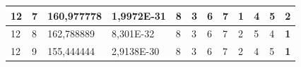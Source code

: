 \documentclass[conference]{IEEEtran}
\begin{document}
\begin{table}[]
\begin{tabular}{|llll|llllllll|}
\multicolumn{1}{|l|}{12}                                                    & \multicolumn{1}{l|}{7}                                                        & \multicolumn{1}{l|}{160,977778}                                                   & 1,9972E-31                     & \multicolumn{1}{l|}{8}                                                  & \multicolumn{1}{l|}{3}                                                  & \multicolumn{1}{l|}{6}                                                  & \multicolumn{1}{l|}{7}                                                  & \multicolumn{1}{l|}{\textbf{1}}                                         & \multicolumn{1}{l|}{4}                                                  & \multicolumn{1}{l|}{5}                                                  & 2                          \\ \hline
\multicolumn{1}{|l|}{12}                                                    & \multicolumn{1}{l|}{8}                                                        & \multicolumn{1}{l|}{162,788889}                                                   & 8,301E-32                      & \multicolumn{1}{l|}{8}                                                  & \multicolumn{1}{l|}{3}                                                  & \multicolumn{1}{l|}{6}                                                  & \multicolumn{1}{l|}{7}                                                  & \multicolumn{1}{l|}{2}                                                  & \multicolumn{1}{l|}{5}                                                  & \multicolumn{1}{l|}{4}                                                  & \textbf{1}                 \\ \hline
\multicolumn{1}{|l|}{12}                                                    & \multicolumn{1}{l|}{9}                                                        & \multicolumn{1}{l|}{155,444444}                                                   & 2,9138E-30                     & \multicolumn{1}{l|}{8}                                                  & \multicolumn{1}{l|}{3}                                                  & \multicolumn{1}{l|}{6}                                                  & \multicolumn{1}{l|}{7}                                                  & \multicolumn{1}{l|}{2}                                                  & \multicolumn{1}{l|}{4}                                                  & \multicolumn{1}{l|}{5}                                                  & \textbf{1}                 \\ \hline

\end{tabular}
\end{table}
\end{document}
